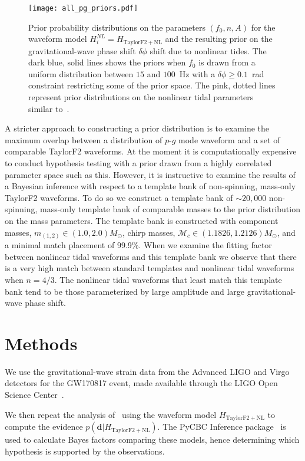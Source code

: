 \begin{figure}[th]
\centering
\texttt{[image: all\_pg\_priors.pdf]}
\caption{Prior probability distributions on the parameters $(f_0, n, A)$ for the waveform model $H^{NL}_i = H_\mathrm{TaylorF2+NL}$ and the resulting prior on the gravitational-wave phase shift $\delta\phi$ shift due to nonlinear tides. The dark blue, solid lines shows the priors when $f_0$ is drawn from a uniform distribution between $15$ and $100$~Hz with a $\delta\phi \ge 0.1$~rad constraint restricting some of the prior space. The pink, dotted lines represent prior distributions on the nonlinear tidal parameters similar to~\cite{abbott2019constraining}.}
\label{fig:priors}
\end{figure}

A stricter approach to constructing a prior distribution is to examine the maximum overlap between a distribution of $p$-$g$ mode waveform and a set of comparable TaylorF2 waveforms. At the moment it is computationally expensive to conduct hypothesis testing with a prior drawn from a highly correlated parameter space such as this. However, it is instructive to examine the results of a Bayesian inference with respect to a template bank of non-spinning, mass-only TaylorF2 waveforms. To do so we construct a template bank of $\sim 20,000$ non-spinning, mass-only template bank of comparable masses to the prior distribution on the mass parameters. The template bank is constructed with component masses, $m_{(1,2)} \in (1.0, 2.0) M_{\odot}$, chirp masses, $\mathcal{M}_c \in (1.1826, 1.2126) M_{\odot}$, and a minimal match placement of 99.9\%. When we examine the fitting factor between nonlinear tidal waveforms and this template bank we observe that there is a very high match between standard templates and nonlinear tidal waveforms when $n = 4/3$. The nonlinear tidal waveforms that least match this template bank tend to be those parameterized by large amplitude and large gravitational-wave phase shift.

\section{Methods} \label{sec:methods}
We use the gravitational-wave strain data from the Advanced LIGO and Virgo detectors for the GW170817 event, made available through the LIGO Open Science Center~\citep{Vallisneri:2014vxa,gw170817-losc}.

We then repeat the analysis of~\cite{de2018tidal} using the waveform model $H_\mathrm{TaylorF2+NL}$ to compute the evidence $p(\mathbf{d}|H_\mathrm{TaylorF2+NL})$.
The PyCBC Inference package~\citep{alex_nitz_2018_1208115,biwer2019pycbc} is used
to calculate Bayes factors comparing these models, hence determining which
hypothesis is supported by the observations. 


